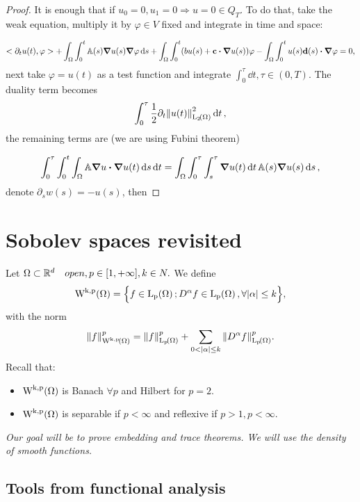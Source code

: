 \documentclass{article}
\begin{document}
\begin{proof}
    It is enough that if $u_0 = 0, u_1 = 0 \Rightarrow u = 0 \in Q_T$. To do that, take the weak equation, multiply it by $\varphi \in V$ fixed and integrate in time and space:

    \begin{equation*}
	    <\partial_t u(t), \varphi> + \int_{\Omega} \int_0^t \tensorq{A}(s) \grad{u}(s) \grad{\varphi}\dd{s} + \int_{\Omega} \int_0^t (bu(s) + \vb{c} \vdot \grad{u}(s) )\varphi - \int_{\Omega} \int_0^t u(s)\vb{d}(s)\vdot \grad{\varphi} = 0, 
    \end{equation*}
    next take $\varphi = u(t)$ as a test function and integrate $\int_0^\tau \dd{t}, \tau \in (0,T)$. The duality term becomes
    \[
	    \int_0^\tau \frac{1}{2} \partial_t \norm{u(t)}_{\LpSet[2]{\Omega}}^{2} \dd{t},
    \]
the remaining terms are (we are using Fubini theorem)

\begin{equation*}
	\int_0^\tau \int_0^t \int_{\Omega} \tensorq{A} \grad{u} \vdot \grad{u}(t) \dd{s} \dd{t} = \int_{\Omega} \int_0^\tau \int_s^\tau \grad{u}(t) \dd{t} \tensorq{A}(s) \grad{u}(s)\dd{s},
\end{equation*}
denote $\partial_{s}w(s) = - u(s)$, then

\end{proof}


\section{Sobolev spaces revisited}
\label{sec:sobolev_revisited}
Let $\Omega \subset {\mathbb R}^d \quad{open}, p \in [1,+\infty], k \in N.$ We define
\[
	\WkpSet{\Omega} = \Big\{f \in \LpSet{\Omega}; D^\alpha f \in \LpSet{\Omega}, \forall |\alpha| \leq k \Big\},
\]
with the norm
\[
	\norm{f}_{\WkpSet{\Omega}}^p = \norm{f}_{\LpSet{\Omega}}^p + \sum_{0< |\alpha| \leq k} \norm{D^\alpha f}_{\LpSet{\Omega}}^p.
\]
Recall that:
\begin{itemize}
\item	$\WkpSet{\Omega}$ is Banach $\forall p$ and Hilbert for $p=2$. 
\item $\WkpSet{\Omega}$ is separable if $p < \infty$ and reflexive if $p>1, p<\infty$.
\end{itemize}


\textit{Our goal will be to prove embedding and trace theorems. We will use the density of smooth functions.}

\subsection{Tools from functional analysis}
\label{sec:fa_tools}
\end{document}
